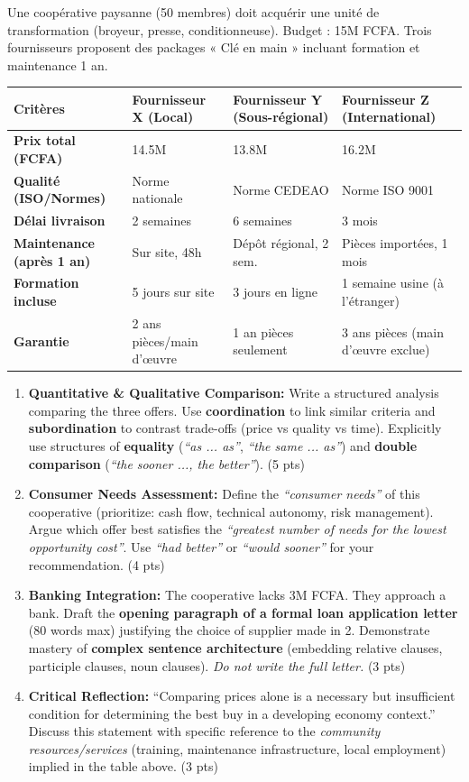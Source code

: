 \documentclass[11pt]{article}
\begin{document}
\begin{exercice}
Une coopérative paysanne (50 membres) doit acquérir une unité de transformation (broyeur, presse, conditionneuse). Budget : 15M FCFA. Trois fournisseurs proposent des packages « Clé en main » incluant formation et maintenance 1 an.

\begin{tabularx}{\linewidth}{>{\bfseries}lXXX}
\toprule
\textbf{Critères} & \textbf{Fournisseur X (Local)} & \textbf{Fournisseur Y (Sous-régional)} & \textbf{Fournisseur Z (International)} \\
\midrule
Prix total (FCFA) & 14.5M & 13.8M & 16.2M \\
Qualité (ISO/Normes) & Norme nationale & Norme CEDEAO & Norme ISO 9001 \\
Délai livraison & 2 semaines & 6 semaines & 3 mois \\
Maintenance (après 1 an) & Sur site, 48h & Dépôt régional, 2 sem. & Pièces importées, 1 mois \\
Formation incluse & 5 jours sur site & 3 jours en ligne & 1 semaine usine (à l'étranger) \\
Garantie & 2 ans pièces/main d'œuvre & 1 an pièces seulement & 3 ans pièces (main d'œuvre exclue) \\
\bottomrule
\end{tabularx}

\begin{enumerate}
    \item \textbf{Quantitative \& Qualitative Comparison:} Write a structured analysis comparing the three offers. Use \textbf{coordination} to link similar criteria and \textbf{subordination} to contrast trade-offs (price vs quality vs time). Explicitly use structures of \textbf{equality} (\textit{``as ... as''}, \textit{``the same ... as''}) and \textbf{double comparison} (\textit{``the sooner ..., the better''}). (5 pts)
    \item \textbf{Consumer Needs Assessment:} Define the \textit{``consumer needs''} of this cooperative (prioritize: cash flow, technical autonomy, risk management). Argue which offer best satisfies the \textit{``greatest number of needs for the lowest opportunity cost''}. Use \textit{``had better''} or \textit{``would sooner''} for your recommendation. (4 pts)
    \item \textbf{Banking Integration:} The cooperative lacks 3M FCFA. They approach a bank. Draft the \textbf{opening paragraph of a formal loan application letter} (80 words max) justifying the choice of supplier made in 2. Demonstrate mastery of \textbf{complex sentence architecture} (embedding relative clauses, participle clauses, noun clauses). \textit{Do not write the full letter.} (3 pts)
    \item \textbf{Critical Reflection:} ``Comparing prices alone is a necessary but insufficient condition for determining the best buy in a developing economy context.'' Discuss this statement with specific reference to the \textit{community resources/services} (training, maintenance infrastructure, local employment) implied in the table above. (3 pts)
\end{enumerate}
\end{exercice}
\end{document}
